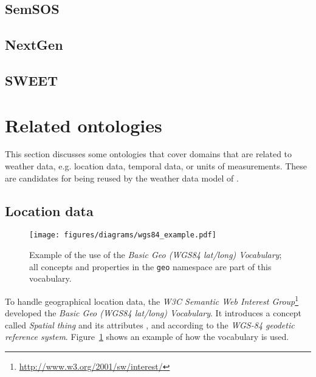 
\subsection{SemSOS}


\subsection{NextGen}


\subsection{SWEET}


\section{Related ontologies}
\label{sec:related_ontologies}

This section discusses some ontologies that cover domains that are related to weather data, e.g. location data, temporal data, or units of measurements. These are candidates for being reused by the weather data model of \thinkhome.

\subsection{Location data}
\label{subsec:location_ontologies}


\begin{figure}
\centering
\texttt{[image: figures/diagrams/wgs84\_example.pdf]}
\caption{Example of the use of the \emph{Basic Geo (WGS84 lat/long) Vocabulary}; all concepts and properties in the \texttt{geo} namespace are part of this vocabulary.}
\label{fig:wgs84_example}
\end{figure}

To handle geographical location data, the \emph{W3C Semantic Web Interest Group}\footnote{\href{http://www.w3.org/2001/sw/interest/}{http://www.w3.org/2001/sw/interest/}} developed the \emph{Basic Geo (WGS84 lat/long) Vocabulary}\cite{wgs84_vocabulary}. It introduces a concept called \emph{Spatial thing} and its attributes ,  and  according to the \emph{WGS-84 geodetic reference system}\cite{WGS84}. Figure~\ref{fig:wgs84_example} shows an example of how the vocabulary is used.

